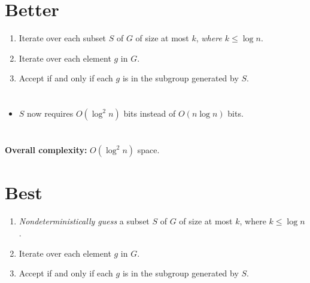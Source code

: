 \documentclass{lposter-with-tkz-graph} %
\newenvironment{poster}{%
\thispagestyle{fancy}
\begin{multicols*}{3}
}%
{\end{multicols*}
}
\begin{document}
\begin{poster}
\columnbreak


\section{Better}

\begin{enumerate}
\item Iterate over each subset $S$ of $G$ of size at most $k$, \emph{where $k \leq \log n$}.
\item Iterate over each element $g$ in $G$.
\item Accept if and only if each $g$ is in the subgroup generated by $S$.
\end{enumerate}

\section{}

\begin{itemize}
\itemsep1em
\item[] $S$ now requires $O(\log^2 n)$ bits instead of $O(n \log n)$ bits.
\end{itemize}

\section{}

\begin{center}
  \textbf{Overall complexity:} $O(\log^2 n)$ space.
\end{center}

\columnbreak


\section{Best}

\begin{enumerate}
\item \emph{Nondeterministically guess} a subset $S$ of $G$ of size at most $k$, where $k \leq \log n$.
\item Iterate over each element $g$ in $G$.
\item Accept if and only if each $g$ is in the subgroup generated by $S$.
\end{enumerate}

\section{}


\end{poster}
\end{document}
